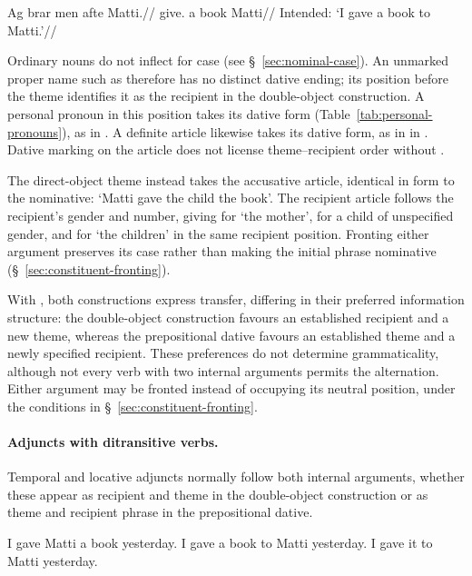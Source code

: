 \pex
\begingl
\gla *Ag brar men afte Matti.//
\glb \First{}\Sg{} give.\Pst{} a book Matti//
\glft Intended: `I gave a book to Matti.'//
\endgl
\xe

Ordinary nouns do not inflect for case (see \S~\ref{sec:nominal-case}). An unmarked proper name such as  therefore has no distinct dative ending; its position before the theme identifies it as the recipient in the double-object construction. A personal pronoun in this position takes its dative form (Table~\ref{tab:personal-pronouns}), as in . A definite article likewise takes its dative form, as in  in . Dative marking on the article does not license theme--recipient order without .

The direct-object theme instead takes the accusative article, identical in form to the nominative:  `Matti gave the child the book'. The recipient article follows the recipient's gender and number, giving  for `the mother',  for a child of unspecified gender, and  for `the children' in the same recipient position. Fronting either argument preserves its case rather than making the initial phrase nominative (\S~\ref{sec:constituent-fronting}).

With , both constructions express transfer, differing in their preferred information structure: the double-object construction favours an established recipient and a new theme, whereas the prepositional dative favours an established theme and a newly specified recipient. These preferences do not determine grammaticality, although not every verb with two internal arguments permits the alternation. Either argument may be fronted instead of occupying its neutral position, under the conditions in \S~\ref{sec:constituent-fronting}.

\paragraph{Adjuncts with ditransitive verbs.}

Temporal and locative adjuncts normally follow both internal arguments, whether these appear as recipient and theme in the double-object construction or as theme and recipient phrase in the prepositional dative.

\pex
\a {}
{I gave Matti a book yesterday.}
\a {}
{I gave a book to Matti yesterday.}
\a {}
{I gave it to Matti yesterday.}
\xe

